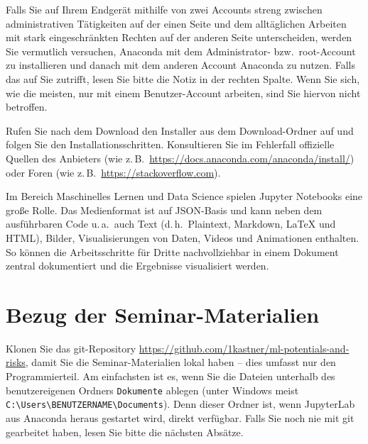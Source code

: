 \documentclass[nobib]{tufte-handout}
\begin{document}
Falls Sie auf Ihrem Endgerät mithilfe von zwei Accounts streng zwischen administrativen Tätigkeiten auf der einen Seite und dem alltäglichen Arbeiten mit stark eingeschränkten Rechten auf der anderen Seite unterscheiden, werden Sie vermutlich versuchen, Anaconda mit dem Administrator- bzw.\ root-Account zu installieren und danach mit dem anderen Account Anaconda zu nutzen.
Falls das auf Sie zutrifft, lesen Sie bitte die Notiz in der rechten Spalte.
%
Wenn Sie sich, wie die meisten, nur mit einem Benutzer-Account arbeiten, sind Sie hiervon nicht betroffen.

Rufen Sie nach dem Download den Installer aus dem Download-Ordner auf und folgen Sie den Installationsschritten.
Konsultieren Sie im Fehlerfall offizielle Quellen des Anbieters
(wie z.\,B.\ \url{https://docs.anaconda.com/anaconda/install/})
oder Foren
(wie z.\,B.\ \url{https://stackoverflow.com}).


Im Bereich Maschinelles Lernen und Data Science spielen Jupyter Notebooks eine  große Rolle.
Das Medienformat ist auf JSON-Basis und kann neben dem ausführbaren Code
u.\,a.\ auch
Text (d.\,h.\ Plaintext, Markdown, LaTeX und HTML),
Bilder,
Visualisierungen von Daten,
Videos und
Animationen
enthalten.
So können die Arbeitsschritte für Dritte nachvollziehbar in einem Dokument zentral dokumentiert und die Ergebnisse visualisiert werden.


\section{Bezug der Seminar-Materialien}
\label{sec:git-clone}

Klonen Sie das git-Repository
\url{https://github.com/1kastner/ml-potentials-and-risks},
damit Sie die Seminar-Materialien lokal haben -- dies umfasst nur den Programmierteil.
Am einfachsten ist es, wenn Sie die Dateien unterhalb des benutzer\-eigenen Ordners \texttt{Dokumente} ablegen
(unter Windows meist \texttt{C:\textbackslash{}Users\textbackslash{}BENUTZERNAME\textbackslash{}Documents}).
Denn dieser Ordner ist, wenn JupyterLab aus Anaconda heraus gestartet wird, direkt verfügbar.
Falls Sie noch nie mit git gearbeitet haben, lesen Sie bitte die nächsten Absätze.
\end{document}
